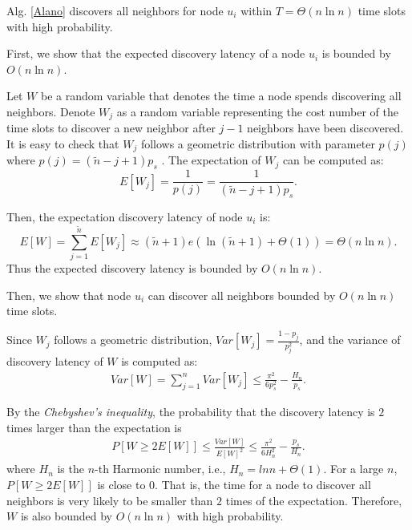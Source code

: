 \begin{theorem}
Alg. \ref{Alano} discovers all neighbors for node $u_i$ within $T=\Theta(n\ln n)$ time slots with high probability.
\end{theorem}
\begin{IEEEproof} First, we show that the expected discovery latency of a node $u_i$ is bounded by $O(n\ln n)$.

Let $W$ be a random variable that denotes the time a node spends
discovering all neighbors. Denote $W_j$ as a random variable
representing the cost number of the time slots to discover a new
neighbor after $j-1$ neighbors have been discovered. It is easy to check
that $W_j$ follows a geometric distribution with parameter $p(j)$ where
$p(j)=(\widetilde{n}-j+1)p_s$ \cite{Motwani1995Randomized}. The
expectation of $W_j$ can be computed as:
$$
E[W_j]=\frac{1}{p(j)}=\frac{1}{(\widetilde{n}-j+1)p_s}.
$$

Then, the expectation discovery latency of node $u_i$ is:
$$
E[W] = \sum_{j=1}^{\widetilde{n}}E[W_j] \approx (\widetilde{n}+1)e(\ln (\widetilde{n}+1) + \Theta(1)) = \Theta(n\ln n).
$$
Thus the expected discovery latency is bounded by $O(n\ln n)$.

Then, we show that node $u_i$ can discover all neighbors bounded by $O(n\ln n)$ time slots.

Since $W_j$ follows a geometric distribution, $Var[W_j]=\frac{1-p_j}{p_j^2}$, and the variance of discovery latency of $W$ is computed as:
\begin{displaymath}
\begin{split}
 Var[W] %
 =\sum_{j=1}^{n}Var[W_j]
 \le\frac{\pi^2}{6p_{s}^2}-\frac{H_n}{p_{s}}.
\end{split}
\end{displaymath}

By the \emph{Chebyshev's inequality}, the probability that the discovery latency is $2$ times larger than the expectation is
\begin{displaymath}
\begin{split}
P[W\ge2E[W]]%
\le\frac{Var[W]}{{E[W]}^2}
\le\frac{\pi^2}{6H_{n}^2}-\frac{p_{s}}{H_n}.
\end{split}
\end{displaymath}
where $H_n$ is the $n$-th Harmonic number, i.e., $H_n = lnn +
\Theta(1)$. For a large $n$, $P[W\ge2E[W]]$ is close to $0$. That is,
the time for a node to discover all neighbors is very likely to be
smaller than $2$ times of the expectation. Therefore, $W$ is also
bounded by $O(n\ln n)$ with high probability.
\end{IEEEproof}


